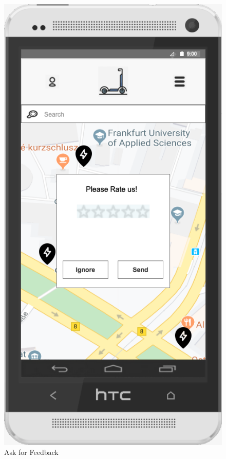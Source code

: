 \documentclass[a4paper, 12pt]{article}
\begin{document}
\begin{figure} [htbp]
  \begin{center}
    \includegraphics[scale=0.6]{04-ask-for-feedback.png}
  \end{center}
  \caption{Ask for Feedback}
\end{figure}
\end{document}

